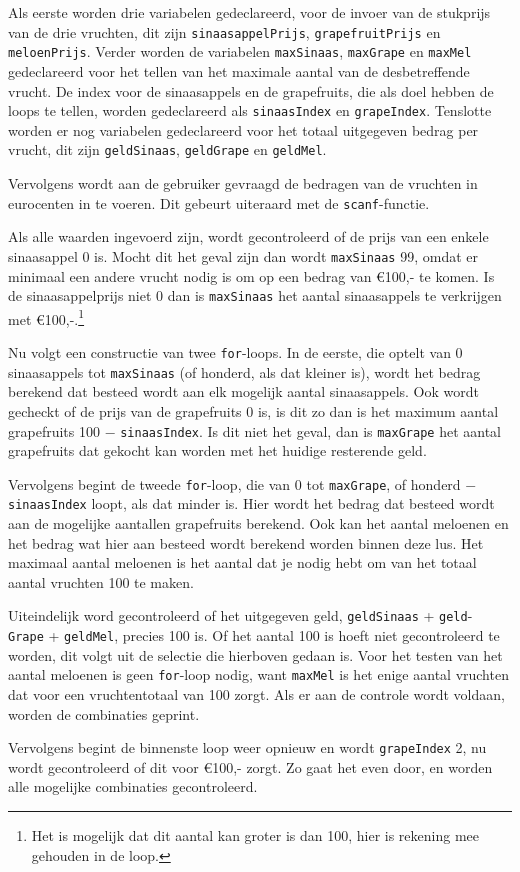 Als eerste worden drie variabelen gedeclareerd, voor de invoer van de stukprijs van de drie vruchten, dit zijn {\tt sinaasappelPrijs}, {\tt grapefruitPrijs} en {\tt meloenPrijs}.
Verder worden de variabelen {\tt maxSinaas}, {\tt maxGrape} en {\tt maxMel} gedeclareerd voor het tellen van het maximale aantal van de desbetreffende vrucht.
De index voor de sinaasappels en de grapefruits, die als doel hebben de loops te tellen, worden gedeclareerd als {\tt sinaasIndex} en {\tt grapeIndex}.
Tenslotte worden er nog variabelen gedeclareerd voor het totaal uitgegeven bedrag per vrucht, dit zijn {\tt geldSinaas}, {\tt geldGrape} en {\tt geldMel}.

Vervolgens wordt aan de gebruiker gevraagd de bedragen van de vruchten in eurocenten in te voeren.
Dit gebeurt uiteraard met de {\tt scanf}-functie.

Als alle waarden ingevoerd zijn, wordt gecontroleerd of de prijs van een enkele sinaasappel 0 is.
Mocht dit het geval zijn dan wordt {\tt maxSinaas} 99, omdat er minimaal een andere vrucht nodig is om op een bedrag van \euro100,- te komen.
Is de sinaasappelprijs niet 0 dan is {\tt maxSinaas} het aantal sinaasappels te verkrijgen met \euro100,-.\footnote{Het is mogelijk dat dit aantal kan groter is dan 100, hier is rekening mee gehouden in de loop.}

Nu volgt een constructie van twee {\tt for}-loops.
In de eerste, die optelt van 0 sinaasappels tot {\tt maxSinaas} (of honderd, als dat kleiner is), wordt het bedrag berekend dat besteed wordt aan elk mogelijk aantal sinaasappels.
Ook wordt gecheckt of de prijs van de grapefruits 0 is, is dit zo dan is het maximum aantal grapefruits 100 $-$ {\tt sinaasIndex}.
Is dit niet het geval, dan is {\tt maxGrape} het aantal grapefruits dat gekocht kan worden met het huidige resterende geld.

Vervolgens begint de tweede {\tt for}-loop, die van 0 tot {\tt maxGrape}, of honderd $-$ {\tt sinaasIndex} loopt, als dat minder is. Hier wordt het bedrag dat besteed wordt aan de mogelijke aantallen grapefruits berekend.
Ook kan het aantal meloenen en het bedrag wat hier aan besteed wordt berekend worden binnen deze lus.
Het maximaal aantal meloenen is het aantal dat je nodig hebt om van het totaal aantal vruchten 100 te maken.

Uiteindelijk word gecontroleerd of het uitgegeven geld, {\tt geldSinaas} + {\tt geld}-\\{\tt Grape} + {\tt geldMel}, precies 100 is.
Of het aantal 100 is hoeft niet gecontroleerd te worden, dit volgt uit de selectie die hierboven gedaan is.
Voor het testen van het aantal meloenen is geen {\tt for}-loop nodig, want {\tt maxMel} is het enige aantal vruchten dat voor een vruchtentotaal van 100 zorgt.
Als er aan de controle wordt voldaan, worden de combinaties geprint.

Vervolgens begint de binnenste loop weer opnieuw en wordt {\tt grapeIndex} 2, nu wordt gecontroleerd of dit voor \euro100,- zorgt. Zo gaat het even door, en worden alle mogelijke combinaties gecontroleerd.

